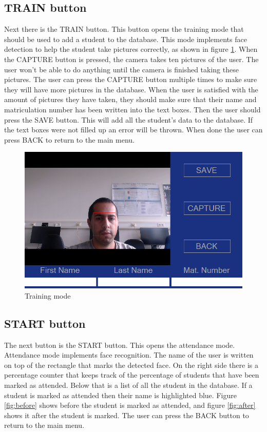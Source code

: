 \documentclass[12pt, a4paper]{article}
\begin{document}
\subsection{TRAIN button}
Next there is the TRAIN button. This button opens the training mode that should be used to add a student to the database. This mode implements face detection to help the student take pictures correctly, as shown in figure \ref{fig:train}. When the CAPTURE button is pressed, the camera takes ten pictures of the user. The user won’t be able to do anything until the camera is finished taking these pictures. The user can press the CAPTURE button multiple times to make sure they will have more pictures in the database. When the user is satisfied with the amount of pictures they have taken, they should make sure that their name and matriculation number has been written into the text boxes. Then the user should press the SAVE button. This will add all the student’s data to the database. If the text boxes were not filled up an error will be thrown. When done the user can press BACK to return to the main menu.
\begin{figure}[h!]
\begin{center}
	\centering
		\includegraphics[width=1.0\columnwidth]{images/train}
	\caption{Training mode}
	\label{fig:train}
\end{center}
\end{figure}

\subsection{START button}
The next button is the START button. This opens the attendance mode. Attendance mode implements face recognition. The name of the user is written on top of the rectangle that marks the detected face. On the right side there is a percentage counter that keeps track of the percentage of students that have been marked as attended. Below that is a list of all the student in the database. If a student is marked as attended then their name is highlighted blue. Figure \ref{fig:before} shows before the student is marked as attended, and figure \ref{fig:after} shows it after the student is marked. The user can press the BACK button to return to the main menu.  
\end{document}

